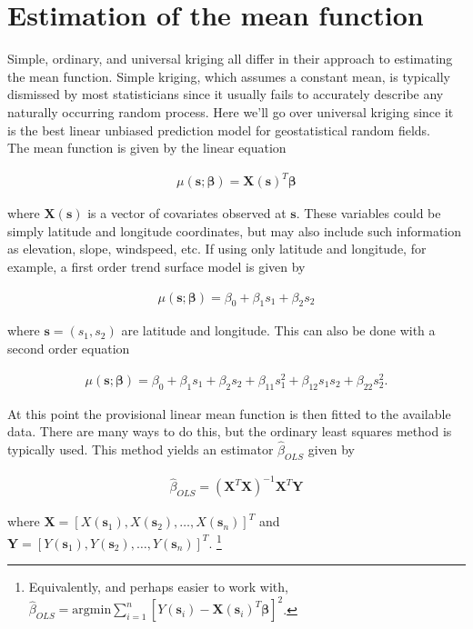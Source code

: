 \documentclass[12pt]{amsart}
\begin{document}
\section{Estimation of the mean function}

Simple, ordinary, and universal kriging all differ in their approach to estimating the mean function. Simple kriging, which assumes a constant mean, is typically dismissed by most statisticians since it usually fails to accurately describe any naturally occurring random process. Here we'll go over universal kriging since it is the best linear unbiased prediction model for geostatistical random fields. \\

The mean function is given by the linear equation

\begin{align*}
\mu(\mathbf{s}; \mathbf{\beta}) = \mathbf{X}(\mathbf{s})^T \mathbf{\beta}
\end{align*} 

where $\mathbf{X}(\mathbf{s})$ is a vector of covariates observed at $\mathbf{s}$. These variables could be simply latitude and longitude coordinates, but may also include such information as elevation, slope, windspeed, etc. If using only latitude and longitude, for example, a first order  trend surface model is given by

\begin{align*}
\mu(\mathbf{s}; \mathbf{\beta}) = \beta_0 + \beta_1s_1 + \beta_2s_2
\end{align*} 

where $\mathbf{s} = (s_1, s_2)$ are latitude and longitude. This can also be done with a second order equation

\begin{align*}
\mu(\mathbf{s}; \mathbf{\beta}) = \beta_0 + \beta_1s_1 + \beta_2s_2 + \beta_{11}s_1^2 + \beta_{12}s_1s_2 + \beta_{22}s_2^2.
\end{align*} 

At this point the provisional linear mean function is then fitted to the available data. There are many ways to do this, but the ordinary least squares method is typically used. This method yields an estimator $\hat\beta_{OLS}$ given by 

\begin{align*}
\hat\beta_{OLS} = (\mathbf{X}^T\mathbf{X})^{-1}\mathbf{X}^T\mathbf{Y} 
\end{align*} 

where $\mathbf{X} = [X(\mathbf{s}_1), X(\mathbf{s}_2), \dots, X(\mathbf{s}_n)]^T$ and $\mathbf{Y} = [Y(\mathbf{s}_1), Y(\mathbf{s}_2), \dots, Y(\mathbf{s}_n)]^T$. \footnote{Equivalently, and perhaps easier to work with, $\hat\beta_{OLS} = \text{argmin}\sum_{i=1}^n[Y(\mathbf{s}_i) - \mathbf{X}(\mathbf{s}_i)^T\mathbf{\beta}]^2$.} \\
\end{document}
